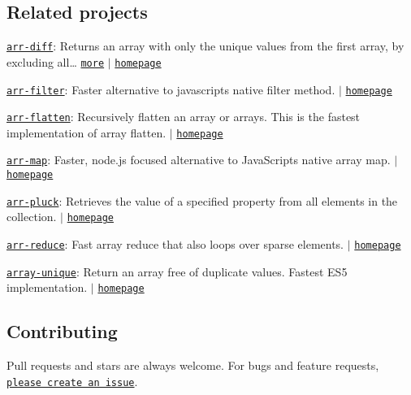 \subsection*{Related projects}


\begin{DoxyItemize}
\item \href{https://www.npmjs.com/package/arr-diff}{\tt arr-\/diff}\+: Returns an array with only the unique values from the first array, by excluding all… \href{https://www.npmjs.com/package/arr-diff}{\tt more} $\vert$ \href{https://github.com/jonschlinkert/arr-diff}{\tt homepage}
\item \href{https://www.npmjs.com/package/arr-filter}{\tt arr-\/filter}\+: Faster alternative to javascript\textquotesingle{}s native filter method. $\vert$ \href{https://github.com/jonschlinkert/arr-filter}{\tt homepage}
\item \href{https://www.npmjs.com/package/arr-flatten}{\tt arr-\/flatten}\+: Recursively flatten an array or arrays. This is the fastest implementation of array flatten. $\vert$ \href{https://github.com/jonschlinkert/arr-flatten}{\tt homepage}
\item \href{https://www.npmjs.com/package/arr-map}{\tt arr-\/map}\+: Faster, node.\+js focused alternative to Java\+Script\textquotesingle{}s native array map. $\vert$ \href{https://github.com/jonschlinkert/arr-map}{\tt homepage}
\item \href{https://www.npmjs.com/package/arr-pluck}{\tt arr-\/pluck}\+: Retrieves the value of a specified property from all elements in the collection. $\vert$ \href{https://github.com/jonschlinkert/arr-pluck}{\tt homepage}
\item \href{https://www.npmjs.com/package/arr-reduce}{\tt arr-\/reduce}\+: Fast array reduce that also loops over sparse elements. $\vert$ \href{https://github.com/jonschlinkert/arr-reduce}{\tt homepage}
\item \href{https://www.npmjs.com/package/array-unique}{\tt array-\/unique}\+: Return an array free of duplicate values. Fastest E\+S5 implementation. $\vert$ \href{https://github.com/jonschlinkert/array-unique}{\tt homepage}
\end{DoxyItemize}

\subsection*{Contributing}

Pull requests and stars are always welcome. For bugs and feature requests, \href{https://github.com/jonschlinkert/arr-union/issues/new}{\tt please create an issue}.

